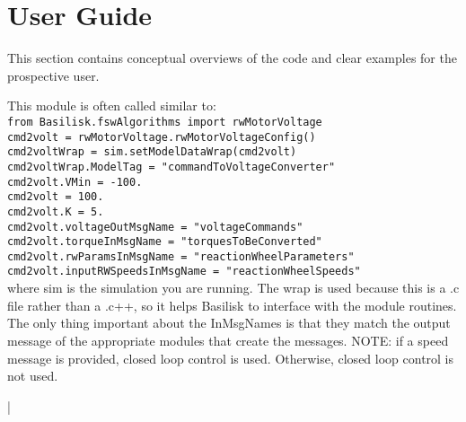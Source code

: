 \section{User Guide}
This section contains conceptual overviews of the code and clear examples for the prospective user. 

This module is often called similar to:\\
\verb|from Basilisk.fswAlgorithms import rwMotorVoltage|\\
\verb|cmd2volt = rwMotorVoltage.rwMotorVoltageConfig()|\\
\verb|cmd2voltWrap = sim.setModelDataWrap(cmd2volt)|\\
\verb|cmd2voltWrap.ModelTag = "commandToVoltageConverter"|\\
\verb|cmd2volt.VMin = -100.|\\
\verb|cmd2volt = 100.|\\
\verb|cmd2volt.K = 5.|\\
\verb|cmd2volt.voltageOutMsgName = "voltageCommands"|\\
\verb|cmd2volt.torqueInMsgName = "torquesToBeConverted"|\\
\verb|cmd2volt.rwParamsInMsgName = "reactionWheelParameters"|\\
\verb|cmd2volt.inputRWSpeedsInMsgName = "reactionWheelSpeeds"|\\

where sim is the simulation you are running. The wrap is used because this is a .c file rather than a .c++, so it helps Basilisk to interface with the module routines. The only thing important about the InMsgNames is that they match the output message of the appropriate modules that create the messages. NOTE: if a speed message is provided, closed loop control is used. Otherwise, closed loop control is not used.


|
